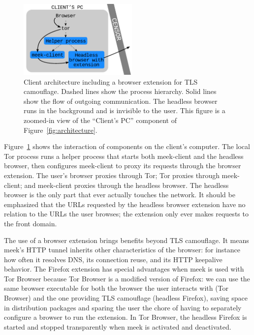 \documentclass{sig-alternate}
\newcommand{\meekclient}{\mbox{meek-client}\xspace}
\newcommand{\meek}{meek\xspace}
\begin{document}
\begin{figure}
\centering
\includegraphics[height=1.5in]{browser-architecture}
\caption{
Client architecture including a browser extension for TLS camouflage.
Dashed lines show the process hierarchy.
Solid lines show the flow of outgoing communication.
The headless browser runs in the background and is invisible to the user.
This figure is a zoomed-in view of the ``Client's PC'' component of Figure~\ref{fig:architecture}.
}
\label{fig:browser-architecture}
\end{figure}

Figure~\ref{fig:browser-architecture} shows the interaction of components
on the client's computer.
The local Tor process runs a helper process that starts both \meekclient
and the headless browser,
then configures \meekclient to proxy its requests through the browser extension.
The user's browser proxies through Tor;
Tor proxies through \meekclient;
and \meekclient proxies through the headless browser.
The headless browser is the only part that ever actually touches the network.
It should be emphasized that the URLs requested by the headless browser extension
have no relation to the URLs the user browses;
the extension only ever makes requests to the front domain.

The use of a browser extension brings benefits beyond TLS camouflage.
It means \meek's HTTP tunnel inherits other characteristics of the browser:
for instance
how often it resolves DNS,
its connection reuse,
and its HTTP keepalive behavior.
The Firefox extension has special advantages
when \meek is used with Tor Browser
because Tor Browser
is a modified version of Firefox:
we can use the same browser executable for both the browser the user interacts with (Tor Browser)
and the one providing TLS camouflage (headless Firefox),
saving space in distribution packages
and sparing the user the chore of having to separately configure a browser to run the extension.
In Tor Browser,
the headless Firefox is started and stopped transparently
when \meek is activated and deactivated.

\end{document}
